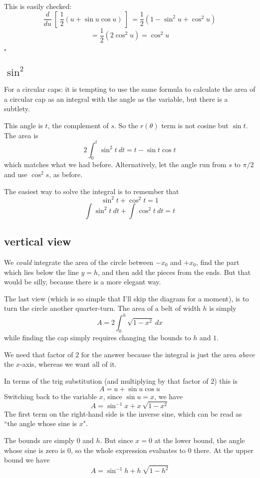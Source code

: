 \documentclass[11pt, oneside]{article}
\begin{document}
This is easily checked:
\[ \frac{d}{d u} \ [ \ \frac{1}{2} (u + \sin u \cos u) \ ] \ = \frac{1}{2} (1 - \sin^2 u + \cos^2 u) \]
\[ = \frac{1}{2} (2 \cos^2 u) = \cos^2 u \] 

$\square$

\subsection*{$\sin^2$}



For a circular caps:  it is tempting to use the same formula to calculate the area of a circular cap as an integral with the angle as the variable, but there is a subtlety.  

This angle is $t$, the complement of $s$.  So the $r(\theta)$ term is not cosine but $\sin t$.  The area is
\[ 2 \int_0^{t} \sin^2 t \ dt = t - \sin t \cos t \]
which matches what we had before.  Alternatively, let the angle run from $s$ to $\pi/2$ and use $\cos^2 s$, as before.

The easiest way to solve the integral is to remember that
\[ \sin^2 t + \cos^2 t = 1 \]
\[ \int \sin^2 t  \ dt + \int \cos^2 t \ dt = t  \]

\subsection*{vertical view}
We \emph{could} integrate the area of the circle between $-x_0$ and $+x_0$, find the part which lies below the line $y = h$, and then add the pieces from the ends.  But that would be silly, because there is a more elegant way.

The last view (which is so simple that I'll skip the diagram for a moment), is to turn the circle another quarter-turn.  The area of a belt of width $h$ is simply
\[ A = 2 \int_0^h  \sqrt{1 - x^2} \ dx \]
while finding the cap simply requires changing the bounds to $h$ and $1$.

We need that factor of $2$ for the answer because the integral is just the area \emph{above} the $x$-axis, whereas we want all of it.

In terms of the trig substitution (and multiplying by that factor of $2$)  this is
\[ A= u + \sin u \cos u \]
Switching back to the variable $x$, since $\sin u = x$, we have
\[ A = \sin^{-1} x + x \ \sqrt{1 - x^2} \]
The first term on the right-hand side is the inverse sine, which can be read as ``the angle whose sine is $x$".

The bounds are simply $0$ and $h$.  But since $x=0$ at the lower bound, the angle whose sine is zero is $0$, so the whole expression evaluates to $0$ there.  At the upper bound we have
\[ A =  \sin^{-1} h + h \ \sqrt{1 - h^2} \]
\end{document}
